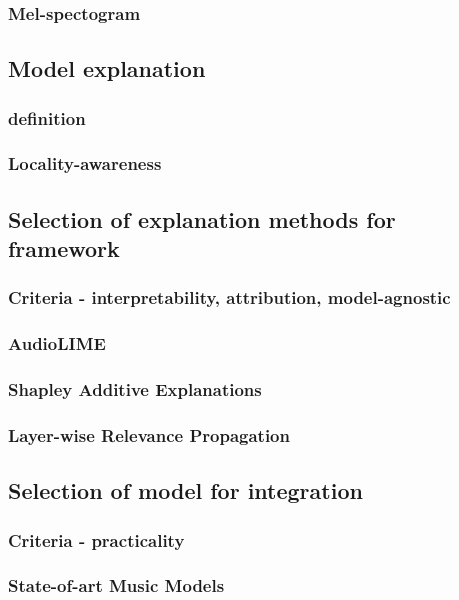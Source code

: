 \documentclass[
    bindingoffset=5mm,  %
    footnoteindent=3mm, %
    hyphenation=true    %
]{src/wut-thesis}
\begin{document}
\subsubsection{Mel-spectogram}

\subsection{Model explanation}
\subsubsection{definition}
\subsubsection{Locality-awareness}

\subsection{Selection of explanation methods for framework}
\subsubsection{Criteria - interpretability, attribution, model-agnostic}
\subsubsection{AudioLIME} \label{ch1:audioLIME}
\subsubsection{Shapley Additive Explanations} \label{ch1:ShapMethod}
\subsubsection{Layer-wise Relevance Propagation} \label{ch1:LrpMethod}

\subsection{Selection of model for integration}
\subsubsection{Criteria - practicality}
\subsubsection{State-of-art Music Models}
\end{document}
